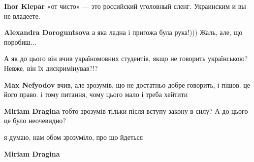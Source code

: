 \begin{itemize}
\begin{itemize}
\textbf{Ihor Klepar} «от чисто» — это российский уголовный сленг. Украинским и вы не владеете.

 
\textbf{Alexandra Doroguntsova} а яка ладна і пригожа була рука!))) Жаль, але, що поробиш...
\end{itemize}

 

А як до цього він вчив україномовних студентів, якщо не говорить українською?
Невже, він їх дискримінував?!?

\begin{itemize}
 
\textbf{Max Nefyodov} вчив, але зрозумів, що не достатньо добре говорить, і пішов. це його право. і тому питання, чому цього мало і треба хейтити

 

\textbf{Miriam Dragina} тобто зрозумів тільки після вступу закону в силу? А до цього це було неочевидно?

 
я думаю, нам обом зрозуміло, про що йдеться

 

\textbf{Miriam Dragina} 


\end{itemize}
\end{itemize}
